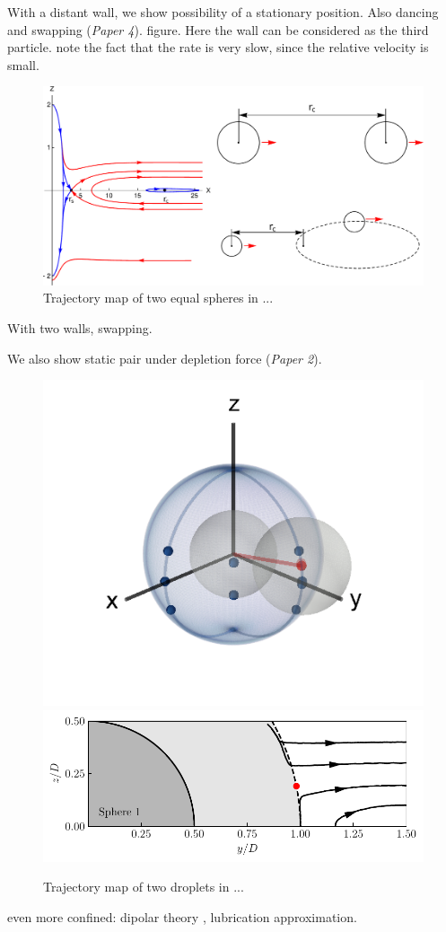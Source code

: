 With a distant wall, we show possibility of a stationary position.
Also dancing and swapping (\emph{Paper 4}). figure.
Here the wall can be considered as the third particle.
note the fact that the rate is very slow, since the relative velocity is small.

\begin{figure}%
  \centering
  \includegraphics[width=0.9\columnwidth]{itzhak-boris.pdf}
  \caption{Trajectory map of two equal spheres in ...}
  \label{fig:itzhak-boris}
\end{figure}


With two walls, \cite{zurita-gotor_2007}
swapping.

We also show static pair under depletion force (\emph{Paper 2}).


\begin{figure}%
  \centering
  \includegraphics[width=0.3\columnwidth]{shell1.png}
  \includegraphics[width=0.6\columnwidth]{traj.pdf}
  \caption{Trajectory map of two droplets in ...}
  \label{fig:shear-align}
\end{figure}

even more confined:
dipolar theory \citep{Cui2004,Beatus2006,Janssen2012,Uspal2013,Desreumaux,zhu_gallaire_2016,q2d_Beatus,Diamant},
lubrication approximation.

